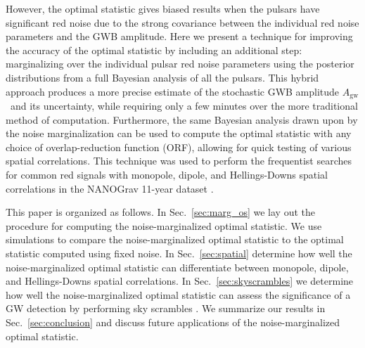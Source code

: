 \documentclass[twocolumn,aps,prd,superscriptaddress]{revtex4-1}
\newcommand{\Agw}{\ensuremath{A_\mathrm{gw}}}
\begin{document}
However, the optimal statistic gives biased results 
when the pulsars have significant red noise 
due to the strong covariance between the individual red noise parameters 
and the GWB amplitude. 
Here we present a technique for improving the accuracy of the optimal statistic by including an additional step: 
marginalizing over the individual pulsar red noise parameters 
using the posterior distributions from a full Bayesian analysis of all the pulsars. 
This hybrid approach produces a more precise estimate of the stochastic GWB amplitude \Agw\ 
and its uncertainty, while requiring only a few minutes over the more traditional method of computation. 
Furthermore, the same Bayesian analysis drawn upon by the noise marginalization 
can be used to compute the optimal statistic with any choice of overlap-reduction function (ORF), 
allowing for quick testing of various spatial correlations. 
This technique was used to perform the frequentist searches 
for common red signals with monopole, dipole, and Hellings-Downs spatial correlations 
in the NANOGrav 11-year dataset \citep{abb+17b}.

This paper is organized as follows. In Sec.~\ref{sec:marg_os} 
we lay out the procedure for computing the noise-marginalized optimal statistic. 
We use simulations to compare the noise-marginalized optimal statistic 
to the optimal statistic computed using fixed noise. 
In Sec.~\ref{sec:spatial} determine how well 
the noise-marginalized optimal statistic can 
differentiate between monopole, dipole, and Hellings-Downs spatial correlations. 
In Sec.~\ref{sec:skyscrambles} we determine how well the noise-marginalized optimal statistic 
can assess the significance of a GW detection by performing sky scrambles \citep{cs2016}. 
We summarize our results in Sec.~\ref{sec:conclusion} 
and discuss future applications of the noise-marginalized optimal statistic.
\end{document}
